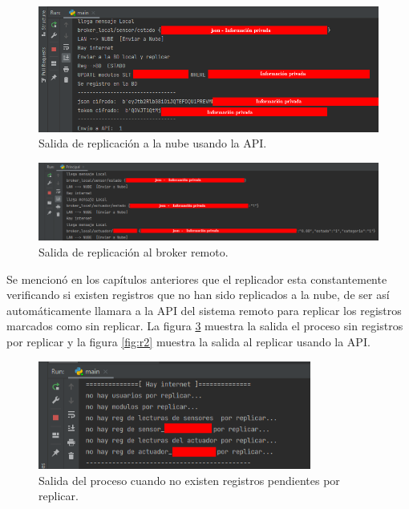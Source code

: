 \begin{figure}[htpb]
\centering 
\includegraphics[width=1.0\textwidth]{./Figures/test/replicador/enviaAPI.png}
\caption{Salida de replicación a la nube usando la API.}
\label{fig:envia1}
\end{figure}

\begin{figure}[htpb]
\centering 
\includegraphics[width=1.0\textwidth]{./Figures/test/replicador/enviabroker.png}
\caption{Salida de replicación al broker remoto.}
\label{fig:envia2}
\end{figure}

Se mencionó en los capítulos anteriores que el replicador esta constantemente verificando si existen registros que no han sido replicados a la nube, de ser así automáticamente llamara a la API del sistema remoto para replicar los registros marcados como sin replicar. La figura \ref{fig:r1} muestra la salida el proceso sin registros por replicar y la figura \ref{fig:r2} muestra la salida al replicar usando la API. 

\begin{figure}[htpb]
\centering 
\includegraphics[width=0.8\textwidth]{./Figures/test/replicador/sinReplicar1.png}
\caption{Salida del proceso cuando no existen registros pendientes por replicar.}
\label{fig:r1}
\end{figure}

